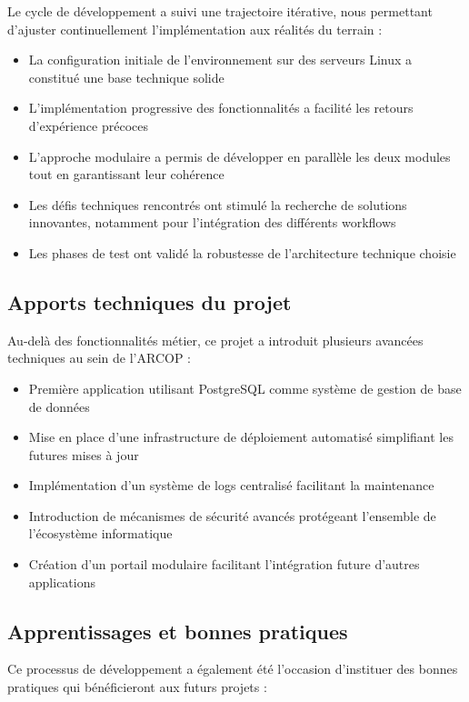 Le cycle de développement a suivi une trajectoire itérative, nous permettant d'ajuster continuellement l'implémentation aux réalités du terrain :

\begin{itemize}
    \item La configuration initiale de l'environnement sur des serveurs Linux a constitué une base technique solide
    \item L'implémentation progressive des fonctionnalités a facilité les retours d'expérience précoces
    \item L'approche modulaire a permis de développer en parallèle les deux modules tout en garantissant leur cohérence
    \item Les défis techniques rencontrés ont stimulé la recherche de solutions innovantes, notamment pour l'intégration des différents workflows
    \item Les phases de test ont validé la robustesse de l'architecture technique choisie
\end{itemize}

\subsection{Apports techniques du projet}

Au-delà des fonctionnalités métier, ce projet a introduit plusieurs avancées techniques au sein de l'ARCOP :

\begin{itemize}
    \item Première application utilisant PostgreSQL comme système de gestion de base de données
    \item Mise en place d'une infrastructure de déploiement automatisé simplifiant les futures mises à jour
    \item Implémentation d'un système de logs centralisé facilitant la maintenance
    \item Introduction de mécanismes de sécurité avancés protégeant l'ensemble de l'écosystème informatique
    \item Création d'un portail modulaire facilitant l'intégration future d'autres applications
\end{itemize}

\subsection{Apprentissages et bonnes pratiques}

Ce processus de développement a également été l'occasion d'instituer des bonnes pratiques qui bénéficieront aux futurs projets :

